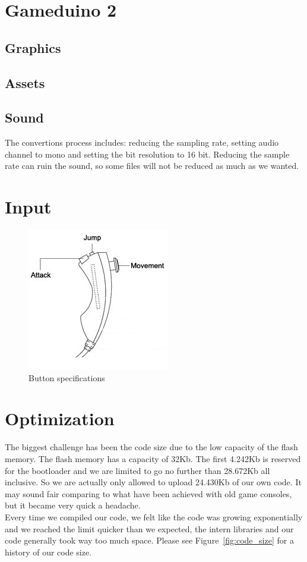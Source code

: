 \section{Gameduino 2}
\subsection{Graphics}
\subsection{Assets}
\subsection{Sound}
The convertions process includes: reducing the sampling rate, setting audio channel to mono and setting
the bit resolution to 16 bit. Reducing the sample rate can ruin the sound, so some files
will not be reduced as much as we wanted.


\section{Input}



\begin{figure}[h] 
  \centering 
  \includegraphics[scale=0.6]{Figures/nunchuk}
  \caption{Button specifications} 
  \label{fig:Nunchuk} 
\end{figure}

\section{Optimization}%
The biggest challenge has been the code size due to the low capacity of the flash memory.  The flash memory has a capacity of 32Kb. The first 4.242Kb is reserved for the bootloader and we are limited to go no further than 28.672Kb all inclusive. So we are actually only allowed to upload 24.430Kb of our own code. It may sound fair comparing to what have been achieved with old game consoles, but it became very quick a headache.\\
Every time we compiled our code, we felt like the code was growing exponentially and we reached the limit quicker than we expected, the intern libraries and our code generally took way too much space. Please see Figure~\ref{fig:code_size} for a history of our code size.

